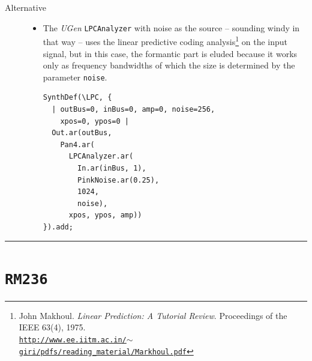 \begin{description}
\bigskip
\newpage
\setcounter{footnote}{0}
\item[Alternative] \hfill 
\begin{itemize}
\item[] The \textsl{UGen} \texttt{LPCAnalyzer} with noise as the source -- sounding windy in that way -- uses the linear predictive coding analysis\footnote{John Makhoul. \textit{Linear Prediction: A Tutorial Review}. Proceedings of the IEEE 63(4), 1975. \\ \href{http://www.ee.iitm.ac.in/~giri/pdfs/reading\_material/Markhoul.pdf}{\scriptsize{\texttt{http://www.ee.iitm.ac.in/$\sim$giri/pdfs/reading\_material/Markhoul.pdf}}} \normalsize{}} on the input signal, but in this case, the formantic part is eluded because it works only as frequency bandwidths of which the size is determined by the parameter \texttt{noise}. 

\smallskip

\begin{lstlisting}
SynthDef(\LPC, {
  | outBus=0, inBus=0, amp=0, noise=256, 
    xpos=0, ypos=0 |
  Out.ar(outBus, 
    Pan4.ar(
      LPCAnalyzer.ar(
        In.ar(inBus, 1), 
        PinkNoise.ar(0.25), 
        1024, 
        noise), 
      xpos, ypos, amp))
}).add;
\end{lstlisting}
\end{itemize}
\end{description}

\bigskip

\begin{center}\rule{0.5\linewidth}{0.5pt}\end{center}

\bigskip

\section*{\texttt{RM236}}


\bigskip

